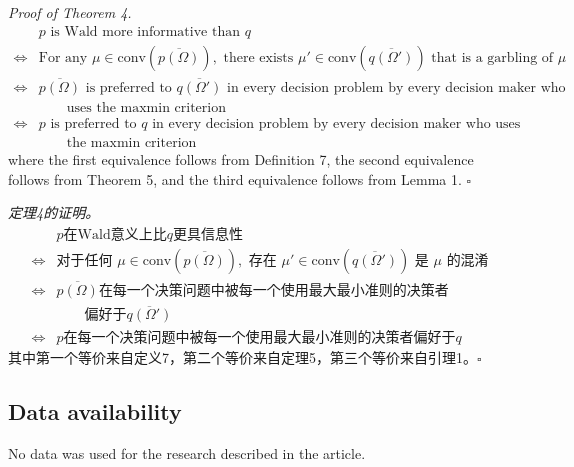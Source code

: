 \documentclass[12pt,a4paper]{article}
\newenvironment{original}
  {\par\vspace{4pt}\noindent\color{black}\ignorespaces}
  {\par\vspace{2pt}}
\newenvironment{translation}
  {\par\vspace{2pt}\noindent\color{myblue}\ignorespaces}
  {\par\vspace{6pt}}
\newcommand{\conv}{\mathrm{conv}}
\begin{document}
\begin{original}
\textit{Proof of Theorem 4.}
\begin{align}
    &\text{$p$ is Wald more informative than $q$} \nonumber\\
    \iff& \text{For any } \mu\in\conv(\overline{p(\Omega)}), \text{ there exists } \mu'\in\conv(\overline{q(\Omega')}) \text{ that is a garbling of } \mu \nonumber\\
    \iff& \text{$\overline{p(\Omega)}$ is preferred to $\overline{q(\Omega')}$ in every decision problem by every decision maker who} \nonumber\\
         &\qquad \text{uses the maxmin criterion} \nonumber\\
    \iff& \text{$p$ is preferred to $q$ in every decision problem by every decision maker who uses} \nonumber\\
         &\qquad \text{the maxmin criterion} \nonumber
\end{align}
where the first equivalence follows from Definition 7, the second equivalence follows from Theorem 5, and the third equivalence follows from Lemma 1. $\square$
\end{original}

\begin{translation}
\textit{定理4的证明。}
\begin{align}
    &\text{$p$在Wald意义上比$q$更具信息性} \nonumber\\
    \iff& \text{对于任何 } \mu\in\conv(\overline{p(\Omega)}), \text{ 存在 } \mu'\in\conv(\overline{q(\Omega')}) \text{ 是 } \mu \text{ 的混淆} \nonumber\\
    \iff& \text{$\overline{p(\Omega)}$在每一个决策问题中被每一个使用最大最小准则的决策者} \nonumber\\
         &\qquad \text{偏好于$\overline{q(\Omega')}$} \nonumber\\
    \iff& \text{$p$在每一个决策问题中被每一个使用最大最小准则的决策者偏好于$q$} \nonumber
\end{align}
其中第一个等价来自定义7，第二个等价来自定理5，第三个等价来自引理1。$\square$
\end{translation}


\subsection*{Data availability}
\begin{original}
No data was used for the research described in the article.
\end{original}
\end{document}

